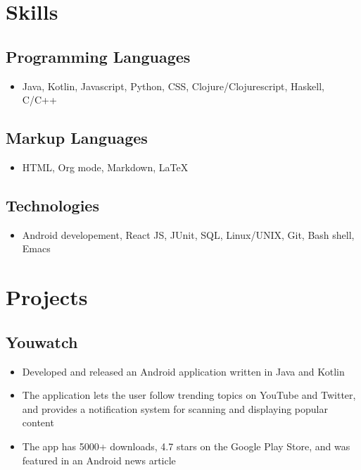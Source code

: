 \documentclass[12pt, noindent]{article}
\begin{document}
\section{Skills}
\subsection{Programming Languages}
\begin{itemize}
\item Java, Kotlin, Javascript, Python, CSS, Clojure/Clojurescript, Haskell,
  C/C++
\end{itemize}

\subsection{Markup Languages}
\begin{itemize}
\item HTML, Org mode, Markdown, \LaTeX{}
\end{itemize}

\subsection{Technologies}
\begin{itemize}
\item Android developement, React JS, JUnit, SQL, Linux/UNIX, Git, Bash shell,
  Emacs
\end{itemize}

\section{Projects}
\subsection{Youwatch}
\begin{itemize}
  \itemsep-.25em
\item Developed and released an Android application written in Java and Kotlin
\item The application lets the user follow trending topics on YouTube and
  Twitter, and provides a notification system for scanning and displaying
  popular content
\item The app has 5000+ downloads, 4.7 stars on the Google Play Store, and was
  featured in an Android news article
\end{itemize}
\vspace{0.25em}
\end{document}
